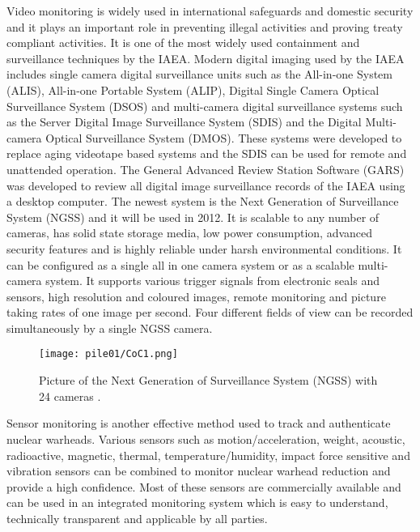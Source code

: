 \documentclass[twoside,titlepage,11pt,twocolumn,a4paper]{article}
\begin{document}
Video monitoring is widely used in international safeguards and
domestic security and it plays an important role in preventing illegal
activities and proving treaty compliant activities. It is one of the
most widely used containment and surveillance techniques by the
IAEA. \citep{wuwen2004} Modern digital imaging used by the IAEA
includes single camera digital surveillance units such as the
All-in-one System (ALIS), All-in-one Portable System (ALIP), Digital
Single Camera Optical Surveillance System (DSOS) and multi-camera
digital surveillance systems such as the Server Digital Image
Surveillance System (SDIS) and the Digital Multi-camera Optical
Surveillance System (DMOS). These systems were developed to replace
aging videotape based systems and the SDIS can be used for remote and
unattended operation. The General Advanced Review Station Software
(GARS) was developed to review all digital image surveillance records
of the IAEA using a desktop
computer. \citep{equipmentIAEAinspectors2002} The newest system is the
Next Generation of Surveillance System (NGSS) and it will be used in
2012. It is scalable to any number of cameras, has solid state storage
media, low power consumption, advanced security features and is highly
reliable under harsh environmental conditions. It can be configured as
a single all in one camera system or as a scalable multi-camera
system. It supports various trigger signals from electronic seals and
sensors, high resolution and coloured images, remote monitoring and
picture taking rates of one image per second. Four different fields of
view can be recorded simultaneously by a single NGSS
camera. \citep{IAEAsafeguards2011}

\begin{figure}
  \texttt{[image: pile01/CoC1.png]}
  \caption{Picture of the Next Generation of Surveillance System
    (NGSS) with 24 cameras \citep{IAEAsafeguards2011}.}
\end{figure}

Sensor monitoring is another effective method used to track and
authenticate nuclear warheads.  Various sensors such as
motion/acceleration, weight, acoustic, radioactive, magnetic, thermal,
temperature/humidity, impact force sensitive and vibration sensors can
be combined to monitor nuclear warhead reduction and provide a high
confidence. Most of these sensors are commercially available and can
be used in an integrated monitoring system which is easy to
understand, technically transparent and applicable by all
parties. \citep{wuwen2004}
\end{document}
